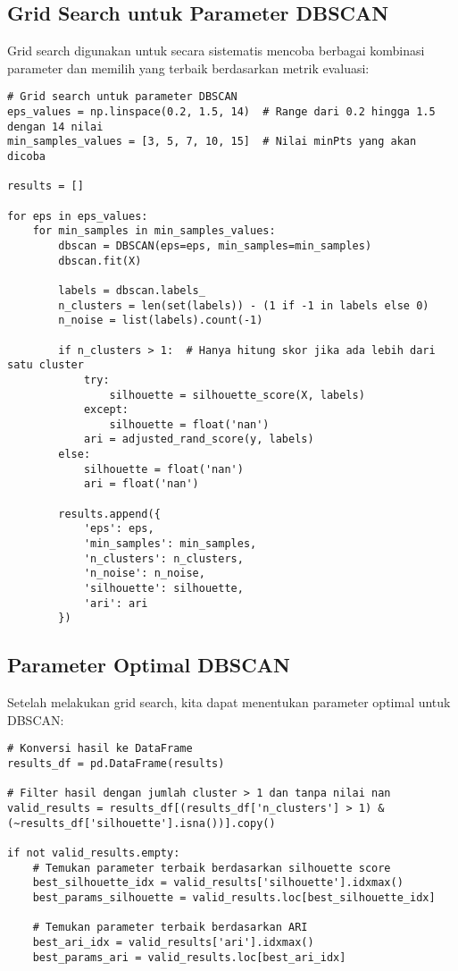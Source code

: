 \documentclass[a4paper,12pt]{article}
\begin{document}
\subsection{Grid Search untuk Parameter DBSCAN}
Grid search digunakan untuk secara sistematis mencoba berbagai kombinasi parameter dan memilih yang terbaik berdasarkan metrik evaluasi:
\begin{lstlisting}
# Grid search untuk parameter DBSCAN
eps_values = np.linspace(0.2, 1.5, 14)  # Range dari 0.2 hingga 1.5 dengan 14 nilai
min_samples_values = [3, 5, 7, 10, 15]  # Nilai minPts yang akan dicoba

results = []

for eps in eps_values:
    for min_samples in min_samples_values:
        dbscan = DBSCAN(eps=eps, min_samples=min_samples)
        dbscan.fit(X)
        
        labels = dbscan.labels_
        n_clusters = len(set(labels)) - (1 if -1 in labels else 0)
        n_noise = list(labels).count(-1)
        
        if n_clusters > 1:  # Hanya hitung skor jika ada lebih dari satu cluster
            try:
                silhouette = silhouette_score(X, labels)
            except:
                silhouette = float('nan')
            ari = adjusted_rand_score(y, labels)
        else:
            silhouette = float('nan')
            ari = float('nan')
        
        results.append({
            'eps': eps,
            'min_samples': min_samples,
            'n_clusters': n_clusters,
            'n_noise': n_noise,
            'silhouette': silhouette,
            'ari': ari
        })
\end{lstlisting}

\subsection{Parameter Optimal DBSCAN}
Setelah melakukan grid search, kita dapat menentukan parameter optimal untuk DBSCAN:
\begin{lstlisting}
# Konversi hasil ke DataFrame
results_df = pd.DataFrame(results)

# Filter hasil dengan jumlah cluster > 1 dan tanpa nilai nan
valid_results = results_df[(results_df['n_clusters'] > 1) & (~results_df['silhouette'].isna())].copy()

if not valid_results.empty:
    # Temukan parameter terbaik berdasarkan silhouette score
    best_silhouette_idx = valid_results['silhouette'].idxmax()
    best_params_silhouette = valid_results.loc[best_silhouette_idx]
    
    # Temukan parameter terbaik berdasarkan ARI
    best_ari_idx = valid_results['ari'].idxmax()
    best_params_ari = valid_results.loc[best_ari_idx]
\end{lstlisting}
\end{document}

